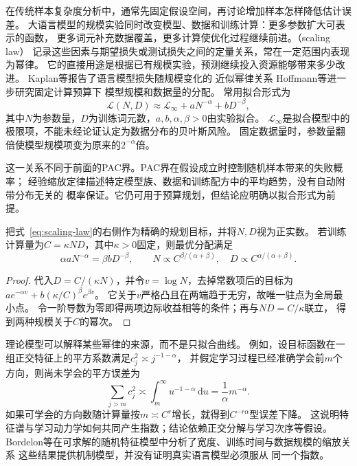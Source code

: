 在传统样本复杂度分析中，通常先固定假设空间，再讨论增加样本怎样降低估计误差。
大语言模型的规模实验同时改变模型、数据和训练计算：更多参数扩大可表示的函数，
更多词元补充数据覆盖，更多计算使优化过程继续前进。（scaling law）
记录这些因素与期望损失或测试损失之间的定量关系，常在一定范围内表现为幂律。
它的直接用途是根据已有规模实验，预测继续投入资源能够带来多少改进。
Kaplan等报告了语言模型损失随规模变化的
近似幂律关系 Hoffmann等进一步研究固定计算预算下
模型规模和数据量的分配。
常用拟合形式为
\begin{equation}
 \mathcal L(N,D)\approx\mathcal L_\infty+aN^{-\alpha}+bD^{-\beta},
 \label{eq:scaling-law}
\end{equation}
其中$N$为参数量，$D$为训练词元数，$a,b,\alpha,\beta>0$由实验拟合。
$\mathcal L_\infty$是拟合模型中的极限项，不能未经论证认定为数据分布的贝叶斯风险。
固定数据量时，参数量翻倍使模型规模项变为原来的$2^{-\alpha}$倍。

这一关系不同于前面的PAC界。PAC界在假设成立时控制随机样本带来的失败概率；
经验缩放定律描述特定模型族、数据和训练配方中的平均趋势，没有自动附带分布无关的
概率保证。它仍可用于预算规划，但结论应明确以拟合形式为前提。

\begin{theorem}[幂律模型下的计算预算分配]
\label{thm:compute-optimal-scaling}
把式~\eqref{eq:scaling-law}的右侧作为精确的规划目标，并将$N,D$视为正实数。
若训练计算量为$C=\kappa ND$，其中$\kappa>0$固定，则最优分配满足
\begin{equation}
 \alpha aN^{-\alpha}=\beta bD^{-\beta},\qquad
 N\propto C^{\beta/(\alpha+\beta)},\quad
 D\propto C^{\alpha/(\alpha+\beta)}.
 \label{eq:compute-optimal-scaling}
\end{equation}
\end{theorem}
\begin{proof}
代入$D=C/(\kappa N)$，并令$v=\log N$，去掉常数项后的目标为
$a e^{-\alpha v}+b(\kappa/C)^\beta e^{\beta v}$。
它关于$v$严格凸且在两端趋于无穷，故唯一驻点为全局最小点。
令一阶导数为零即得两项边际收益相等的条件；再与$ND=C/\kappa$联立，
得到两种规模关于$C$的幂次。
\end{proof}

理论模型可以解释某些幂律的来源，而不是只拟合曲线。
例如，设目标函数在一组正交特征上的平方系数满足$c_j^2\asymp j^{-1-\alpha}$，
并假定学习过程已经准确学会前$m$个方向，则尚未学会的平方误差为
\[
 \sum_{j>m}c_j^2\asymp\int_m^\infty u^{-1-\alpha}\,\mathrm du
 =\frac1\alpha m^{-\alpha}.
\]
如果可学会的方向数随计算量按$m\asymp C^r$增长，就得到$C^{-r\alpha}$型误差下降。
这说明特征谱与学习动力学如何共同产生指数；结论依赖正交分解与学习次序等假设。
Bordelon等在可求解的随机特征模型中分析了宽度、训练时间与数据规模的缩放关系 这些结果提供机制模型，并没有证明真实语言模型必须服从
同一个指数。

